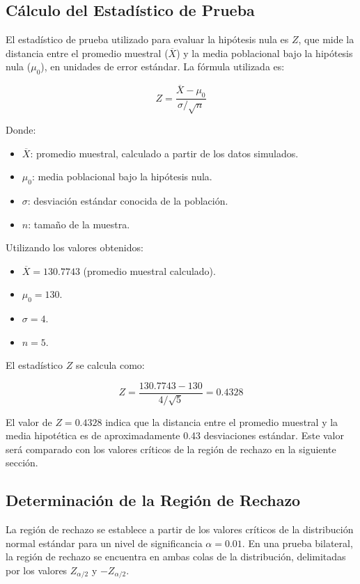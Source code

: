 \documentclass[a4paper,12pt]{article}
\begin{document}
\subsection{Cálculo del Estadístico de Prueba}

El estadístico de prueba utilizado para evaluar la hipótesis nula es \( Z \), que mide la distancia entre el promedio muestral (\( \overline{X} \)) y la media poblacional bajo la hipótesis nula (\( \mu_0 \)), en unidades de error estándar. La fórmula utilizada es:

\[
Z = \frac{\overline{X} - \mu_0}{\sigma / \sqrt{n}}
\]

Donde:
\begin{itemize}
    \item \( \overline{X} \): promedio muestral, calculado a partir de los datos simulados.
    \item \( \mu_0 \): media poblacional bajo la hipótesis nula.
    \item \( \sigma \): desviación estándar conocida de la población.
    \item \( n \): tamaño de la muestra.
\end{itemize}

Utilizando los valores obtenidos:
\begin{itemize}
    \item \( \overline{X} = 130.7743 \) (promedio muestral calculado).
    \item \( \mu_0 = 130 \).
    \item \( \sigma = 4 \).
    \item \( n = 5 \).
\end{itemize}

El estadístico \( Z \) se calcula como:

\[
Z = \frac{130.7743 - 130}{4 / \sqrt{5}} = 0.4328
\]

El valor de \( Z = 0.4328 \) indica que la distancia entre el promedio muestral y la media hipotética es de aproximadamente 0.43 desviaciones estándar. Este valor será comparado con los valores críticos de la región de rechazo en la siguiente sección.

\subsection{Determinación de la Región de Rechazo}

La región de rechazo se establece a partir de los valores críticos de la distribución normal estándar para un nivel de significancia \( \alpha = 0.01 \). En una prueba bilateral, la región de rechazo se encuentra en ambas colas de la distribución, delimitadas por los valores \( Z_{\alpha/2} \) y \( -Z_{\alpha/2} \).
\end{document}
